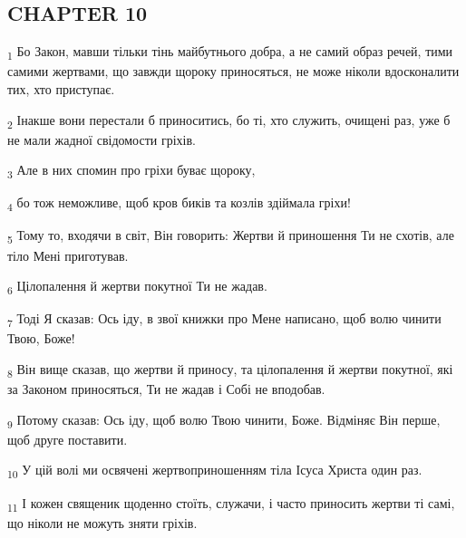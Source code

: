 \subsection{CHAPTER 10}
\begin{tcolorbox}
\textsubscript{1} Бо Закон, мавши тільки тінь майбутнього добра, а не самий образ речей, тими самими жертвами, що завжди щороку приносяться, не може ніколи вдосконалити тих, хто приступає.
\end{tcolorbox}
\begin{tcolorbox}
\textsubscript{2} Інакше вони перестали б приноситись, бо ті, хто служить, очищені раз, уже б не мали жадної свідомости гріхів.
\end{tcolorbox}
\begin{tcolorbox}
\textsubscript{3} Але в них спомин про гріхи буває щороку,
\end{tcolorbox}
\begin{tcolorbox}
\textsubscript{4} бо тож неможливе, щоб кров биків та козлів здіймала гріхи!
\end{tcolorbox}
\begin{tcolorbox}
\textsubscript{5} Тому то, входячи в світ, Він говорить: Жертви й приношення Ти не схотів, але тіло Мені приготував.
\end{tcolorbox}
\begin{tcolorbox}
\textsubscript{6} Цілопалення й жертви покутної Ти не жадав.
\end{tcolorbox}
\begin{tcolorbox}
\textsubscript{7} Тоді Я сказав: Ось іду, в звої книжки про Мене написано, щоб волю чинити Твою, Боже!
\end{tcolorbox}
\begin{tcolorbox}
\textsubscript{8} Він вище сказав, що жертви й приносу, та цілопалення й жертви покутної, які за Законом приносяться, Ти не жадав і Собі не вподобав.
\end{tcolorbox}
\begin{tcolorbox}
\textsubscript{9} Потому сказав: Ось іду, щоб волю Твою чинити, Боже. Відміняє Він перше, щоб друге поставити.
\end{tcolorbox}
\begin{tcolorbox}
\textsubscript{10} У цій волі ми освячені жертвоприношенням тіла Ісуса Христа один раз.
\end{tcolorbox}
\begin{tcolorbox}
\textsubscript{11} І кожен священик щоденно стоїть, служачи, і часто приносить жертви ті самі, що ніколи не можуть зняти гріхів.
\end{tcolorbox}
